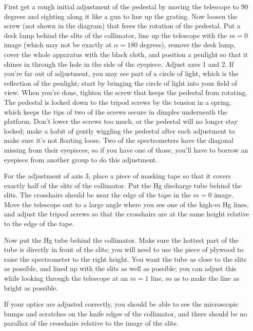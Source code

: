 First get a rough initial adjustment of the pedestal by moving the telescope to 90 degrees
and sighting along it like a gun to line up the grating.
Now loosen the screw (not shown in the diagram) that frees the rotation of the pedestal.
Put a desk lamp behind the slits of the collimator, line up the telescope with
the $m=0$ image (which may not be exactly at $\alpha=180$ degrees), remove the desk
lamp, cover the whole apparatus with the black cloth, and position a penlight
so that it shines in through the hole in the side of the eyepiece. Adjust axes
1 and 2. If you're far out of adjustment, you may see part of a circle of light,
which is the reflection of the penlight; start by bringing the circle of light
into your field of view. When you're done, tighten the screw that keeps the pedestal
from rotating. The pedestal is locked down to the tripod screws by the tension in
a spring, which keeps the tips of two of the screws secure in dimples underneath the
platform. Don't lower the screws too much, or the pedestal will no longer
stay locked; make a habit of gently wiggling the pedestal after each adjustment
to make sure it's not floating loose. Two of the spectrometers have the diagonal
missing from their eyepieces, so if you have one of those, you'll have to borrow
an eyepiece from another group to do this adjustment.

For the adjustment of axis 3, place a piece of masking tape so that it covers exactly
half of the slits of the collimator. Put the Hg discharge tube behind the slits.
The crosshairs should be near the edge of the tape in the $m=0$ image. Move the telescope out to
a large angle where you see one of the high-$m$ Hg lines, and adjust the tripod screws
so that the crosshairs are at the same height relative to the edge of the tape.

\observations

Now put the Hg tube behind the collimator. Make sure the
hottest part of the tube is directly in
front of the slits; you will need to use the piece of
plywood to raise the spectrometer to the right height.
You want the tube as close to the slits as possible, and
lined up with the slits as well as possible; you can adjust
this while looking through the telescope at an $m=1$ line,
so as to make the line as bright as possible.

If your optics are adjusted correctly,
you should be able to see the microscopic
bumps and scratches on the knife edges of the collimator,
and there should be no parallax of the crosshairs relative
to the image of the slits.

